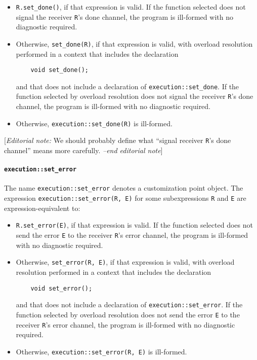 \documentclass[a4paper,12pt,notitlepage,twoside,openright]{article}
\begin{document}
\begin{itemize}
\item
  \texttt{R.set_done()}, if that expression is valid. If the
  function selected does not signal the receiver
  \texttt{R}'s done channel, the program is ill-formed with
  no diagnostic required.
\item
  Otherwise, \texttt{set_done(R)}, if that expression is
  valid, with overload resolution performed in a context that includes
  the declaration

  \begin{verbatim}
    void set_done();
  \end{verbatim}

  and that does not include a declaration of
  \texttt{execution::set_done}. If the function selected by
  overload resolution does not signal the receiver
  \texttt{R}'s done channel, the program is ill-formed with
  no diagnostic required.
\item
  Otherwise, \texttt{execution::set_done(R)} is ill-formed.
\end{itemize}

{[}\emph{Editorial note:} We should probably define what ``signal
receiver \texttt{R}'s done channel'' means more carefully.
\emph{--end editorial note}{]}

\hypertarget{executionset_error}{%
\paragraph{\texorpdfstring{\texttt{execution::set_error}}{}}\label{executionset_error}}

The name \texttt{execution::set_error} denotes a
customization point object. The expression
\texttt{execution::set_error(R, E)} for some subexpressions
\texttt{R} and \texttt{E} are
expression-equivalent to:

\begin{itemize}
\item
  \texttt{R.set_error(E)}, if that expression is valid. If
  the function selected does not send the error \texttt{E}
  to the receiver \texttt{R}'s error channel, the program is
  ill-formed with no diagnostic required.
\item
  Otherwise, \texttt{set_error(R, E)}, if that expression is
  valid, with overload resolution performed in a context that includes
  the declaration

  \begin{verbatim}
    void set_error();
  \end{verbatim}

  and that does not include a declaration of
  \texttt{execution::set_error}. If the function selected by
  overload resolution does not send the error \texttt{E} to
  the receiver \texttt{R}'s error channel, the program is
  ill-formed with no diagnostic required.
\item
  Otherwise, \texttt{execution::set_error(R, E)} is
  ill-formed.
\end{itemize}
\end{document}
